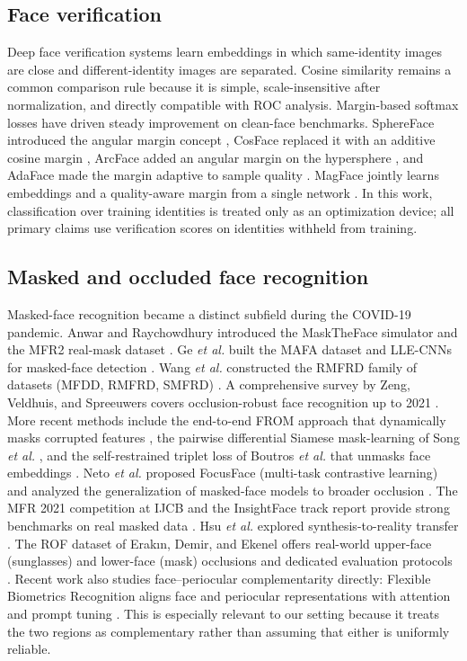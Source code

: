 \documentclass[10pt,journal,compsoc]{IEEEtran}
\begin{document}
\subsection{Face verification}
Deep face verification systems learn embeddings in which same-identity images are close and different-identity images are separated. Cosine similarity remains a common comparison rule because it is simple, scale-insensitive after normalization, and directly compatible with ROC analysis. Margin-based softmax losses have driven steady improvement on clean-face benchmarks. SphereFace introduced the angular margin concept \cite{sphereface}, CosFace replaced it with an additive cosine margin \cite{cosface}, ArcFace added an angular margin on the hypersphere \cite{arcface}, and AdaFace made the margin adaptive to sample quality \cite{adaface}. MagFace jointly learns embeddings and a quality-aware margin from a single network \cite{magface}. In this work, classification over training identities is treated only as an optimization device; all primary claims use verification scores on identities withheld from training.

\subsection{Masked and occluded face recognition}
Masked-face recognition became a distinct subfield during the COVID-19 pandemic. Anwar and Raychowdhury introduced the MaskTheFace simulator and the MFR2 real-mask dataset \cite{mfr2}. Ge \textit{et al.} built the MAFA dataset and LLE-CNNs for masked-face detection \cite{llecnn}. Wang \textit{et al.} constructed the RMFRD family of datasets (MFDD, RMFRD, SMFRD) \cite{rmfrd}. A comprehensive survey by Zeng, Veldhuis, and Spreeuwers covers occlusion-robust face recognition up to 2021 \cite{surveyocc}. More recent methods include the end-to-end FROM approach that dynamically masks corrupted features \cite{from2022}, the pairwise differential Siamese mask-learning of Song \textit{et al.} \cite{masklearn}, and the self-restrained triplet loss of Boutros \textit{et al.} that unmasks face embeddings \cite{umr}. Neto \textit{et al.} proposed FocusFace (multi-task contrastive learning) \cite{focusface} and analyzed the generalization of masked-face models to broader occlusion \cite{beyondmasks}. The MFR 2021 competition at IJCB and the InsightFace track report provide strong benchmarks on real masked data \cite{mfr2021,insightfacemfr}. Hsu \textit{et al.} explored synthesis-to-reality transfer \cite{hsu2022}. The ROF dataset of Erakın, Demir, and Ekenel offers real-world upper-face (sunglasses) and lower-face (mask) occlusions and dedicated evaluation protocols \cite{rof}. Recent work also studies face--periocular complementarity directly: Flexible Biometrics Recognition aligns face and periocular representations with attention and prompt tuning \cite{fbr2024}. This is especially relevant to our setting because it treats the two regions as complementary rather than assuming that either is uniformly reliable.
\end{document}
